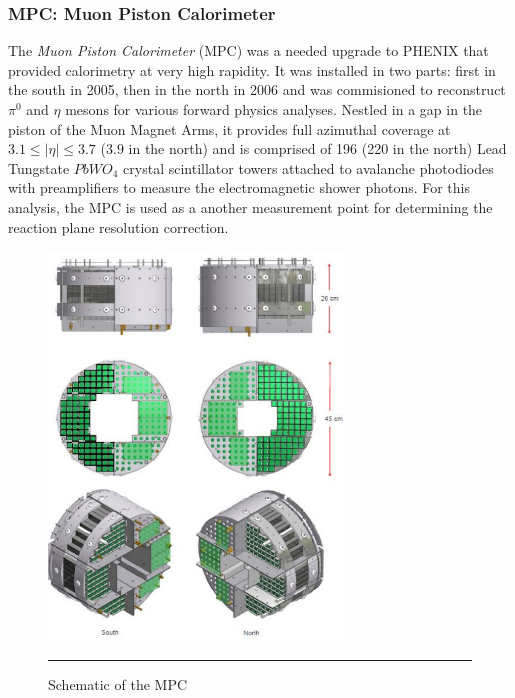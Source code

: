 \subsubsection{MPC: Muon Piston Calorimeter}
The \textit{Muon Piston Calorimeter} (MPC) was a needed upgrade to PHENIX that provided calorimetry at very high rapidity\citep{kleinjanthesis}. It was installed in two parts: first in the south in 2005, then in the north in 2006 and was commisioned to reconstruct $\pi^{0}$ and $\eta$ mesons for various forward physics analyses. Nestled in a gap in the piston of the Muon Magnet Arms, it provides full azimuthal coverage at $3.1 \leq  | \eta | \leq 3.7$ ($3.9$ in the north) and is comprised of 196 (220 in the north) Lead Tungstate $PbWO_4$ crystal scintillator towers attached to avalanche photodiodes with preamplifiers to measure the electromagnetic shower photons. For this analysis, the MPC is used as a another measurement point for determining the reaction plane resolution correction. 

\begin{figure}[h!]
  \centering
    \includegraphics[width=0.7\textwidth]{Figures/mpcschematic.JPG}
    \rule{35em}{0.5pt}
  \caption[Schematic of the MPC]{Schematic of the MPC}
  \label{fig:mpcschematic}
\end{figure}

